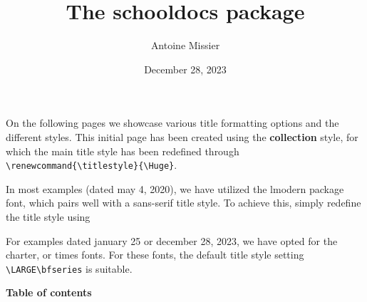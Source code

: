 \documentclass[a4paper,11pt]{article}
\title{The schooldocs package}
\author{Antoine Missier}
\institute{Royal College of Pataphysics}
\date{December 28, 2023}
\renewcommand{\titlestyle}{\Huge} %
\begin{document}
\maketitle

On the following pages we showcase various title formatting options
and the different styles. 
This initial page has been created using the \textbf{collection} style, for which
the main title style has been redefined through
\verb|\renewcommand{\titlestyle}{\Huge}|.


\medskip
In most examples (dated may 4, 2020), we have utilized
the \textsf{lmodern} package font, which pairs well with a sans-serif title style.
To achieve this, simply redefine the title style using
\smallskip
{}

\smallskip
For examples dated january 25 or december 28, 2023, we have opted 
for the \textsf{charter}, or	\textsf{times} fonts. 
For these fonts, the default title style setting 
\verb|\LARGE\bfseries| is suitable.


\seprule

\begin{center} \Large \color{darkbrown}
\bfseries Table of contents
\end{center}

\bigskip
\end{document}
